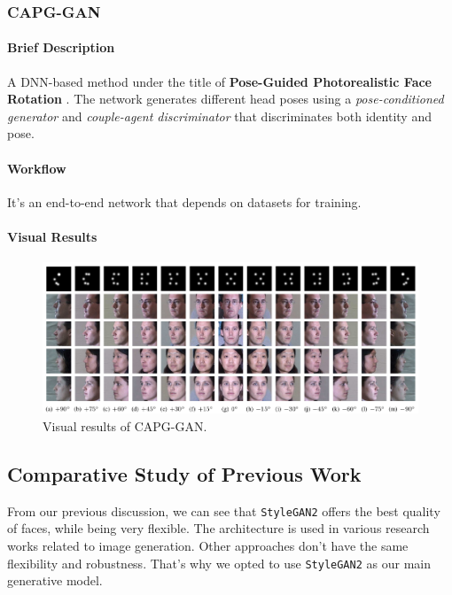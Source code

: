 \subsubsection{CAPG-GAN}

\paragraph{Brief Description}
A DNN-based method under the title of \textbf{Pose-Guided Photorealistic Face Rotation} \cite{8578974}. The network generates different head poses using a \emph{pose-conditioned generator} and \emph{couple-agent discriminator} that discriminates both identity and pose.

\paragraph{Workflow}
It's an end-to-end network that depends on datasets for training.

\paragraph{Visual Results}
\begin{figure}[H]
    \centering
    \includegraphics[width=\textwidth]{images/capg-gan.png}
    \caption{Visual results of CAPG-GAN.}
    \label{fig:capg}
\end{figure}

\subsection{Comparative Study of Previous Work}
From our previous discussion, we can see that \texttt{StyleGAN2} offers the best quality of faces, while being very flexible. The architecture is used in various research works related to image generation. Other approaches don't have the same flexibility and robustness. That's why we opted to use \texttt{StyleGAN2} as our main generative model. 

